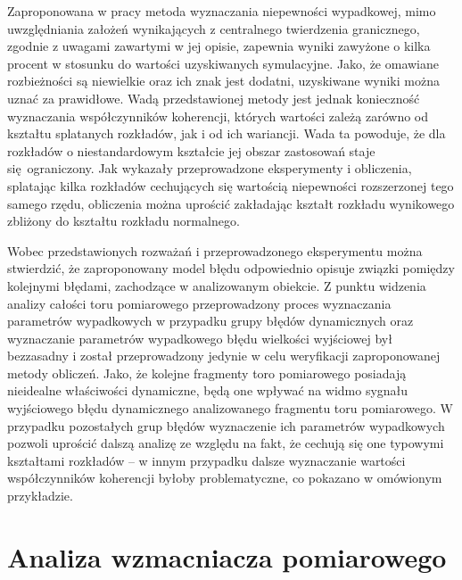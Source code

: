 Zaproponowana w pracy \cite{jakubiec_system} metoda wyznaczania niepewności wypadkowej, mimo uwzględniania założeń wynikających z centralnego twierdzenia granicznego, zgodnie z uwagami zawartymi w jej opisie, zapewnia wyniki zawyżone o kilka procent w stosunku do wartości uzyskiwanych symulacyjne. Jako, że omawiane rozbieżności są niewielkie oraz ich znak jest dodatni, uzyskiwane wyniki można uznać za prawidłowe. Wadą przedstawionej metody jest jednak konieczność wyznaczania współczynników koherencji, których wartości zależą zarówno od kształtu splatanych rozkładów, jak i od ich wariancji. Wada ta powoduje, że dla rozkładów o niestandardowym kształcie jej obszar zastosowań staje się ograniczony. Jak wykazały przeprowadzone eksperymenty i obliczenia, splatając kilka rozkładów cechujących się wartością niepewności rozszerzonej tego samego rzędu, obliczenia można uprościć zakładając kształt rozkładu wynikowego zbliżony do kształtu rozkładu normalnego.

Wobec przedstawionych rozważań i przeprowadzonego eksperymentu można stwierdzić, że zaproponowany model błędu odpowiednio opisuje związki pomiędzy kolejnymi błędami, zachodzące w analizowanym obiekcie. Z punktu widzenia analizy całości toru pomiarowego przeprowadzony proces wyznaczania parametrów wypadkowych w przypadku grupy błędów dynamicznych oraz wyznaczanie parametrów wypadkowego błędu wielkości wyjściowej był bezzasadny i został przeprowadzony jedynie w celu weryfikacji zaproponowanej metody obliczeń. Jako, że kolejne fragmenty toro pomiarowego posiadają nieidealne właściwości dynamiczne, będą one wpływać na widmo sygnału wyjściowego błędu dynamicznego analizowanego fragmentu toru pomiarowego. W przypadku pozostałych grup błędów wyznaczenie ich parametrów wypadkowych pozwoli uprościć dalszą analizę ze względu na fakt, że cechują się one typowymi kształtami rozkładów -- w innym przypadku dalsze wyznaczanie wartości współczynników koherencji byłoby problematyczne, co pokazano w omówionym przykładzie.

\section{Analiza wzmacniacza pomiarowego}

